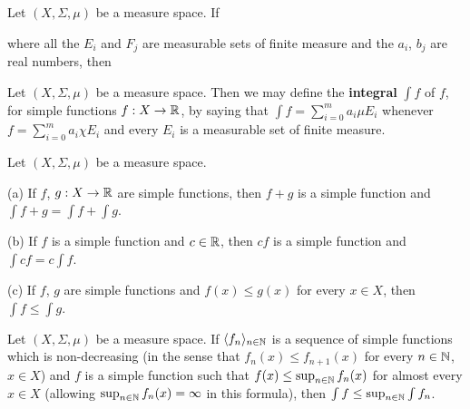  Let $(X,\Sigma,\mu)$ be a measure space.   If


\noindent where all the $E_i$ and $F_j$ are
measurable sets of finite measure and the $ a_i$, $ b_j$ are real
numbers, then




 Let $(X,\Sigma,\mu)$ be a measure space.
Then we
may define the {\bf integral} $\int f$ of $f$, for simple functions
$f:X\to\Bbb R$, by saying that
$\int f=\sum_{i=0}^m a_i\mu E_i$ whenever $f=\sum_{i=0}^m a_i\chi
E_i$ and every $E_i$ is a measurable set of finite measure.

 Let $(X,\Sigma,\mu)$ be a measure space.

(a) If $f$, $g:X\to\Bbb R$ are simple functions, then $f+g$ is a
simple
function and $\int f+g=\int f+\int g$.

(b) If $f$ is a simple function and $c\in\Bbb R$, then $cf$ is a
simple
function and $\int cf=c\int f$.

(c)  If $f$, $g$ are simple functions and $f(x)\le g(x)$ for every
$x\in
X$, then $\int f\le \int g$.



 Let $(X,\Sigma,\mu)$ be a measure space.
If $\langle f_n\rangle_{n\in\Bbb N}$ is a sequence of simple functions
which is non-decreasing (in the sense that $f_n(x)\le f_{n+1}(x)$ for
every $n\in\Bbb N$, $x\in X$) and $f$ is a simple function such that
$f(x)\le\sup_{n\in\Bbb N}f_n(x)$ for almost every $x\in X$ (allowing
$\sup_{n\in\Bbb N}f_n(x)=\infty$ in this formula), then
$\int f\le\sup_{n\in\Bbb N}\int f_n$.

